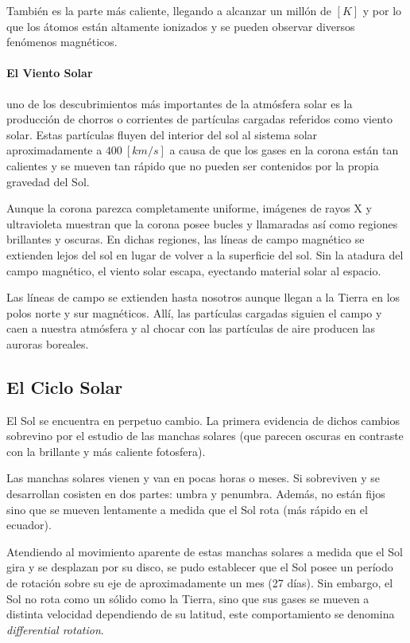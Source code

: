 \documentclass{tufte-handout}
\begin{document}
También es la parte más caliente, llegando a alcanzar un millón de $[K]$ y por lo que los átomos están altamente ionizados y se pueden observar diversos fenómenos magnéticos.

\paragraph{El Viento Solar}

uno de los descubrimientos más importantes de la atmósfera solar es la producción de chorros o corrientes de partículas cargadas referidos como viento solar. Estas partículas fluyen del interior del sol al sistema solar aproximadamente a $400~[km/s]$ a causa de que los gases en la corona están tan calientes y se mueven tan rápido que no pueden ser contenidos por la propia gravedad del Sol.

Aunque la corona parezca completamente uniforme, imágenes de rayos X y ultravioleta muestran que la corona posee bucles y llamaradas así como regiones brillantes y oscuras. En dichas regiones, las líneas de campo magnético se extienden lejos del sol en lugar de volver a la superficie del sol. Sin la atadura del campo magnético, el viento solar escapa, eyectando material solar al espacio.

Las líneas de campo se extienden hasta nosotros aunque llegan a la Tierra en los polos norte y sur magnéticos. Allí, las partículas cargadas siguien el campo y caen a nuestra atmósfera y al chocar con las partículas de aire producen las auroras boreales.

\subsection{El Ciclo Solar}

El Sol se encuentra en perpetuo cambio. La primera evidencia de dichos cambios sobrevino por el estudio de las manchas solares (que parecen oscuras en contraste con la brillante y más caliente fotosfera).

Las manchas solares vienen y van en pocas horas o meses. Si sobreviven y se desarrollan cosisten en dos partes: umbra y penumbra. Además, no están fijos sino que se mueven lentamente a medida que el Sol rota (más rápido en el ecuador).

Atendiendo al movimiento aparente de estas manchas solares a medida que el Sol gira y se desplazan por su disco, se pudo establecer que el Sol posee un período de rotación sobre su eje de aproximadamente un mes (27 días). Sin embargo, el Sol no rota como un sólido como la Tierra, sino que sus gases se mueven a distinta velocidad dependiendo de su latitud, este comportamiento se denomina \emph{differential rotation}.
\end{document}
